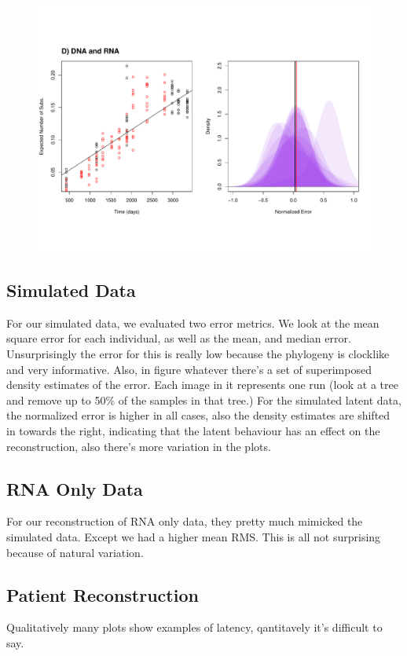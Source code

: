 \begin{figure}[!ht]
	\includegraphics[trim=0cm 4cm 0cm 7cm, clip=true,scale=0.425]{figures/lanl.pdf}
	\caption[Examples]{}
\end{figure}


\subsection{Simulated Data} \label{sec:sim_results}
For our simulated data, we evaluated two error metrics. We look at the mean square error for each individual, as well as the mean, and median error. Unsurprisingly the error for this is really low because the phylogeny is clocklike and very informative. Also, in figure whatever there’s a set of superimposed density estimates of the error. Each image in it represents one run (look at a tree and remove up to 50\% of the samples in that tree.) For the simulated latent data, the normalized error is higher in all cases, also the density estimates are shifted in towards the right, indicating that the latent behaviour has an effect on the reconstruction, also there’s more variation in the plots.


\subsection{RNA Only Data} \label{sec:rna_only}
For our reconstruction of RNA only data, they pretty much mimicked the simulated data. Except we had a higher mean RMS. This is all not surprising because of natural variation.  

\subsection{Patient Reconstruction}
Qualitatively many plots show examples of latency, qantitavely it's difficult to say. 

